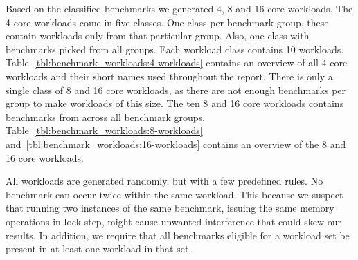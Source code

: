 Based on the classified benchmarks we generated 4, 8 and 16 core workloads.
The 4 core workloads come in five classes.
One class per benchmark group, these contain workloads only from that particular group.
Also, one class with benchmarks picked from all groups.
Each workload class contains 10 workloads.
Table~\ref{tbl:benchmark_workloads:4-workloads} contains an overview of all 4 core workloads and their short names used throughout the report.
There is only a single class of 8 and 16 core workloads, as there are not enough benchmarks per group to make workloads of this size. 
The ten 8 and 16 core workloads contains benchmarks from across all benchmark groups.
Table~\ref{tbl:benchmark_workloads:8-workloads} and~\ref{tbl:benchmark_workloads:16-workloads} contains an overview of the 8 and 16 core workloads.

All workloads are generated randomly, but with a few predefined rules.
No benchmark can occur twice within the same workload.
This because we suspect that running two instances of the same benchmark, issuing the same memory operations in lock step, might cause unwanted interference that could skew our results. 
In addition, we require that all benchmarks eligible for a workload set be present in at least one workload in that set.